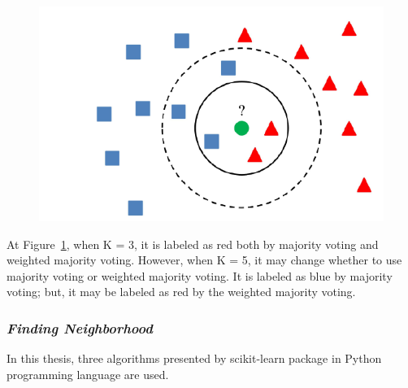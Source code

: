 \begin{figure}[h]
	\centering
	\includegraphics[width=.6\linewidth]{fig/knn_example.png}
	\vspace*{2mm}
	\label{knn_example}
\end{figure}

At Figure~\ref{knn_example}, when K = 3, it is labeled as red both by majority voting and weighted majority voting. However, when K = 5, it may change whether to use majority voting or weighted majority voting. It is labeled as blue by majority voting; but, it may be labeled as red by the weighted majority voting.

\subsubsection*{\textit{Finding Neighborhood}}

In this thesis, three algorithms presented by scikit-learn
package \cite{scikit-learn} in Python programming language are used.

